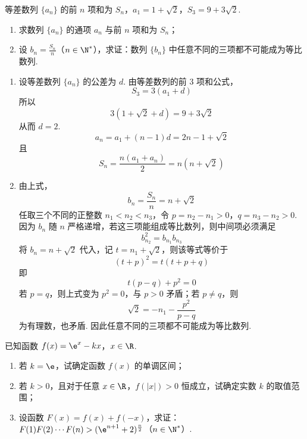 \begin{problem}
等差数列 \(\{a_{n}\}\) 的前 \(n\) 项和为 \(S_{n}\)，\(a_{1} = 1 + \sqrt{2}\)，\(S_{3} = 9 + 3\sqrt{2}\).

\begin{enumerate}
\item 求数列 \(\{a_{n}\}\) 的通项 \(a_{n}\) 与前 \(n\) 项和为 \(S_{n}\)；
\item 设 \(b_{n} = \frac{S_{n}}{n}\)（\(n \in \N^*\)），求证：数列 \(\{b_{n}\}\) 中任意不同的三项都不可能成为等比数列.
\end{enumerate}
\end{problem}

\begin{solution}
\begin{enumerate}
\item 设等差数列 \(\{a_{n}\}\) 的公差为 \(d\). 由等差数列的前 \(3\) 项和公式，
\[
S_{3}=3(a_{1}+d)
\]
所以
\[
3(1+\sqrt{2}+d)=9+3\sqrt{2}
\]
从而 \(d=2\).
\[
a_{n}=a_{1}+(n-1)d=2n-1+\sqrt{2}
\]
且
\[
S_{n}=\frac{n(a_{1}+a_{n})}{2}=n(n+\sqrt{2})
\]

\item 由上式，
\[
b_{n}=\frac{S_{n}}{n}=n+\sqrt{2}
\]
任取三个不同的正整数 \(n_{1}<n_{2}<n_{3}\)，令 \(p=n_{2}-n_{1}>0\)，\(q=n_{3}-n_{2}>0\).
因为 \(b_{n}\) 随 \(n\) 严格递增，若这三项能组成等比数列，则中间项必须满足
\[
b_{n_{2}}^{2}=b_{n_{1}}b_{n_{3}}
\]
将 \(b_{n}=n+\sqrt{2}\) 代入，记 \(t=n_{1}+\sqrt{2}\)，则该等式等价于
\[
(t+p)^{2}=t(t+p+q)
\]
即
\[
t(p-q)+p^{2}=0
\]
若 \(p=q\)，则上式变为 \(p^{2}=0\)，与 \(p>0\) 矛盾；若 \(p\neq q\)，则
\[
\sqrt{2}=-n_{1}-\frac{p^{2}}{p-q}
\]
为有理数，也矛盾. 因此任意不同的三项都不可能成为等比数列.
\end{enumerate}
\end{solution}

\begin{problem}
已知函数 \(f(x) = \e^{x} - kx\)，\(x \in \R\).

\begin{enumerate}
\item 若 \(k = \e\)，试确定函数 \(f(x)\) 的单调区间；
\item 若 \(k > 0\)，且对于任意 \(x \in \R\)，\(f(|x|) > 0\) 恒成立，试确定实数 \(k\) 的取值范围；
\item 设函数 \(F(x) = f(x) + f(-x)\)，求证：\(F(1)F(2)\cdots F(n) > (\e^{n+1} + 2)^{\frac{n}{2}}\)（\(n \in \N^*\)）.
\end{enumerate}
\end{problem}

